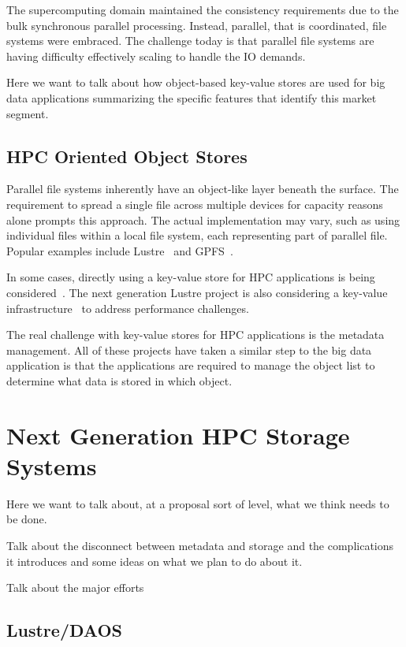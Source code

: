 The supercomputing domain maintained the consistency requirements due to the
bulk synchronous parallel processing. Instead, parallel, that is coordinated,
file systems were embraced. The challenge today is that parallel file systems
are having difficulty effectively scaling to handle the IO demands.

Here we want to talk about how object-based key-value stores are used for big
data applications summarizing the specific features that identify this market
segment.

\subsection{HPC Oriented Object Stores}

Parallel file systems inherently have an object-like layer beneath the surface.
The requirement to spread a single file across multiple devices for capacity
reasons alone prompts this approach. The actual implementation may vary, such
as using individual files within a local file system, each representing part
of parallel file. Popular examples include
Lustre~\cite{braam:2002:lustre-arch} and GPFS~\cite{schmuck:2002:gpfs}.

In some cases, directly using a key-value store for HPC applications is being
considered~\cite{yin:2014:key-value-parallel}. The next generation Lustre
project is also considering a key-value infrastructure~\cite{barton:2013:lustre} to address performance challenges.

The real challenge with key-value stores for HPC applications is the metadata
management. All of these projects have taken a similar step to the big data
application is that the applications are required to manage the object list to
determine what data is stored in which object.

\section{Next Generation HPC Storage Systems}\label{sec:intro}

Here we want to talk about, at a proposal sort of level, what we think needs
to be done.

Talk about the disconnect between metadata and storage and the complications
it introduces and some ideas on what we plan to do about it.

Talk about the major efforts

\subsection{Lustre/DAOS}

